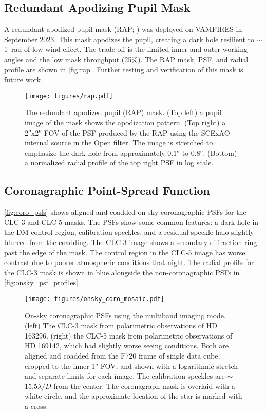 \subsection{Redundant Apodizing Pupil Mask}

A redundant apodized pupil mask (RAP; \citealp{leboulleux_redundant_2022}) was deployed on VAMPIRES in September 2023. This mask apodizes the pupil, creating a dark hole resilient to $\sim$\SI{1}{rad} of low-wind effect. The trade-off is the limited inner and outer working angles and the low mask throughput (25\%). The RAP mask, PSF, and radial profile are shown in \autoref{fig:rap}. Further testing and verification of this mask is future work.

\begin{figure}
    \centering
    \texttt{[image: figures/rap.pdf]}
    \caption{The redundant apodized pupil (RAP) mask. (Top left) a pupil image of the mask shows the apodization pattern. (Top right) a \ang{;;2}x\ang{;;2} FOV of the PSF produced by the RAP using the SCExAO internal source in the Open filter. The image is stretched to emphasize the dark hole from approximately \ang{;;0.1} to \ang{;;0.8}. (Bottom) a normalized radial profile of the top right PSF in log scale.\label{fig:rap}}
\end{figure}

\subsection{Coronagraphic Point-Spread Function}

\autoref{fig:coro_psfs} shows aligned and coadded on-sky coronagraphic PSFs for the CLC-3 and CLC-5 masks. The PSFs show some common features: a dark hole in the DM control region, calibration speckles, and a residual speckle halo slightly blurred from the coadding. The CLC-3 image shows a secondary diffraction ring past the edge of the mask. The control region in the CLC-5 image has worse contrast due to poorer atmospheric conditions that night. The radial profile for the CLC-3 mask is shown in blue alongside the non-coronagraphic PSFs in \autoref{fig:onsky_psf_profiles}.

\begin{figure}
    \centering
    \texttt{[image: figures/onsky\_coro\_mosaic.pdf]}
    \caption{On-sky coronagraphic PSFs using the multiband imaging mode. (left) The CLC-3 mask from polarimetric observations of HD 163296. (right) the CLC-5 mask from polarimetric observations of HD 169142, which had slightly worse seeing conditions. Both are aligned and coadded from the F720 frame of single data cube, cropped to the inner \ang{;;1} FOV, and shown with a logarithmic stretch and separate limits for each image. The calibration speckles are $\sim$15.5$\lambda/D$ from the center. The coronagraph mask is overlaid with a white circle, and the approximate location of the star is marked with a cross.\label{fig:coro_psfs}}
\end{figure}


